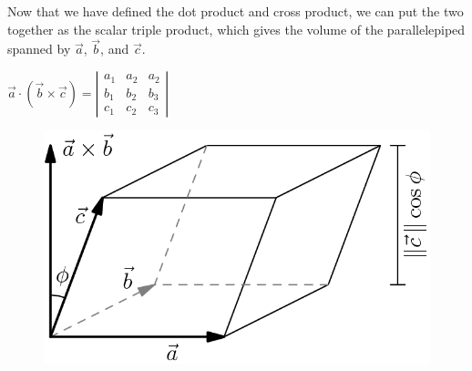 


\noindent
Now that we have defined the dot product and cross product, we can put the two together as the scalar triple product, which gives the volume of the parallelepiped spanned by $\vec{a}$, $\vec{b}$, and $\vec{c}$.\\
\begin{center}
	$\vec{a}\cdot\left(\vec{b}\times\vec{c}\right)=\left|\begin{matrix}a_1 & a_2 & a_2\\b_1 & b_2 & b_3 \\ c_1 & c_2 & c_3\end{matrix}\right|$
\end{center}

\begin{figure}[h]
	\centering
	\includegraphics[scale=0.29]{Images/backgroundReview/Parallelipiped}
\end{figure}
